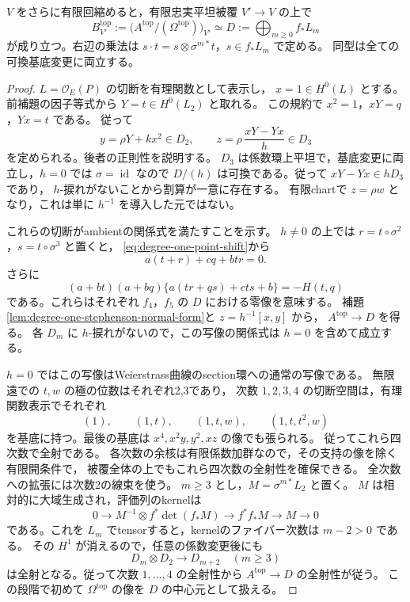 \begin{theorem}\label{thm:degree-one-relative-thcr}
$V$ をさらに有限回縮めると，有限忠実平坦被覆 $V'\to V$ の上で
\[
 B^{\mathrm{top}}_{V'}
   :=\bigl(A^{\mathrm{top}}/(\Omega^{\mathrm{top}})\bigr)_{V'}
       \simeq D:=\bigoplus_{m\ge0} f_*L_m
\]
が成り立つ。右辺の乗法は
$s\cdot t=s\otimes\sigma^{m*}t$，$s\in f_*L_m$ で定める。
同型は全ての可換基底変更に両立する。
\end{theorem}
\begin{proof}
$L=\mathcal O_E(P)$ の切断を有理関数として表示し，
$x=1\in H^0(L)$ とする。
前補題の因子等式から
$Y=t\in H^0(L_2)$ と取れる。
この規約で $x^2=1$，$xY=q$，$Yx=t$ である。
従って
\[
 y=\rho Y+kx^2\in D_2,\qquad
 z=\rho\,\frac{xY-Yx}{h}\in D_3
\]
を定められる。後者の正則性を説明する。
$D_3$ は係数環上平坦で，基底変更に両立し，$h=0$ では $\sigma=\operatorname{id}$ なので
$D/(h)$ は可換である。従って $xY-Yx\in hD_3$ であり，
$h$-捩れがないことから割算が一意に存在する。
有限chartで $z=\rho w$ となり，これは単に $h^{-1}$ を導入した元ではない。

これらの切断がambientの関係式を満たすことを示す。
$h\ne0$ の上では $r=t\circ\sigma^2$，$s=t\circ\sigma^3$ と置くと，
\eqref{eq:degree-one-point-shift}から
\[
 a(t+r)+cq+btr=0.
\]
さらに
\begin{equation}\label{eq:degree-one-second-relation-certificate}
 (a+bt)(a+bq)\{a(tr+qs)+cts+b\}=-H(t,q)
\end{equation}
である。これらはそれぞれ $f_4$，$f_5$ の $D$ における零像を意味する。
補題\ref{lem:degree-one-stephenson-normal-form}と $z=h^{-1}[x,y]$ から，
$A^{\mathrm{top}}\to D$ を得る。
各 $D_m$ に $h$-捩れがないので，この写像の関係式は $h=0$ を含めて成立する。

$h=0$ ではこの写像はWeierstrass曲線のsection環への通常の写像である。
無限遠での $t,w$ の極の位数はそれぞれ2,3であり，
次数 $1,2,3,4$ の切断空間は，有理関数表示でそれぞれ
\[
 (1),\qquad (1,t),\qquad (1,t,w),\qquad(1,t,t^2,w)
\]
を基底に持つ。最後の基底は $x^4,x^2y,y^2,xz$ の像でも張られる。
従ってこれら四次数で全射である。
各次数の余核は有限係数加群なので，その支持の像を除く有限開条件で，
被覆全体の上でもこれら四次数の全射性を確保できる。
全次数への拡張には次数2の線束を使う。
$m\ge3$ とし，$M=\sigma^{m*}L_2$ と置く。
$M$ は相対的に大域生成され，評価列のkernelは
\[
 0\longrightarrow M^{-1}\otimes f^*\det(f_*M)
   \longrightarrow f^*f_*M\longrightarrow M\longrightarrow0
\]
である。これを $L_m$ でtensorすると，kernelのファイバー次数は $m-2>0$ である。
その $H^1$ が消えるので，任意の係数変更後にも
\begin{equation}\label{eq:degree-one-thcr-generation}
 D_m\otimes D_2\longrightarrow D_{m+2}
 \quad(m\ge3)
\end{equation}
は全射となる。従って次数 $1,\ldots,4$ の全射性から $A^{\mathrm{top}}\to D$ の全射性が従う。
この段階で初めて $\Omega^{\mathrm{top}}$ の像を $D$ の中心元として扱える。


\end{proof}

